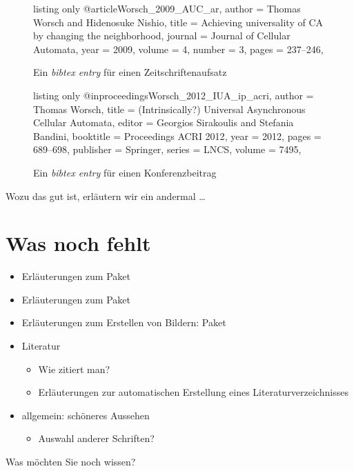 \begin{figure}[htb]
\begin{tcblisting}{listing only}
@article{Worsch_2009_AUC_ar,
  author  = {Thomas Worsch and Hidenosuke Nishio},
  title   = {Achieving universality of {CA} by changing the neighborhood},
  journal = {Journal of Cellular Automata},
  year    = {2009},
  volume  = {4},
  number  = {3},
  pages   = {237--246},
}
\end{tcblisting}
\caption{Ein \emph{bibtex entry} für einen Zeitschriftenaufsatz}
\label{bibtex:article}
\end{figure}

\begin{figure}[htb]
\begin{tcblisting}{listing only}
@inproceedings{Worsch_2012_IUA_ip_acri,
  author    = {Thomas Worsch},
  title     = {({I}ntrinsically?) Universal Asynchronous Cellular Automata},
  editor    = {Georgios Sirakoulis and Stefania Bandini},
  booktitle = {Proceedings ACRI 2012},
  year      = {2012},
  pages     = {689--698},
  publisher = {Springer},
  series    = {LNCS},
  volume    = {7495},
}
\end{tcblisting}
\caption{Ein \emph{bibtex entry} für einen Konferenzbeitrag}
\label{bibtex:inproceedings}
\end{figure}

Wozu das gut ist, erläutern wir ein andermal \dots

\section{Was noch fehlt}
\label{sec:todo}

\begin{itemize}[noitemsep]
\item Erläuterungen zum Paket 
\item Erläuterungen zum Paket 
\item Erläuterungen zum Erstellen von Bildern: Paket 
\item Literatur
  \begin{itemize}
  \item Wie zitiert man?
  \item Erläuterungen zur automatischen Erstellung eines Literaturverzeichnisses
  \end{itemize}
\item allgemein: schöneres Aussehen
  \begin{itemize}
  \item Auswahl anderer Schriften?
  \end{itemize}
\end{itemize}
%
Was möchten Sie noch wissen?


